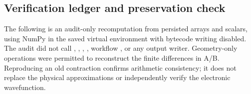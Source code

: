 \documentclass[10pt,a4paper]{article}
\begin{document}
\begin{landscape}
\clearpage
\section{Verification ledger and preservation check}
The following is an audit-only recomputation from persisted arrays and scalars, using NumPy in the saved virtual environment with bytecode writing disabled. The audit did not call , , , , workflow , or any output writer. Geometry-only  operations were permitted to reconstruct the finite differences in A/B. Reproducing an old contraction confirms arithmetic consistency; it does not replace the physical approximations or independently verify the electronic wavefunction.


\end{landscape}
\end{document}
